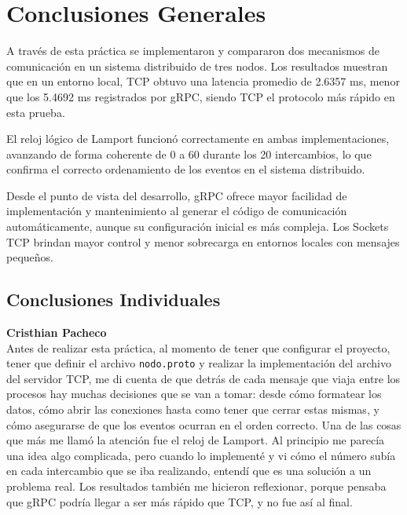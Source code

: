 \documentclass[12pt,a4paper]{article}
\begin{document}
\newpage
\section{Conclusiones Generales}

A través de esta práctica se implementaron y compararon dos mecanismos de comunicación en un sistema distribuido de tres nodos. Los resultados muestran que en un entorno local, TCP obtuvo una latencia promedio de 2.6357 ms, menor que los 5.4692 ms registrados por gRPC, siendo TCP el protocolo más rápido en esta prueba.

El reloj lógico de Lamport funcionó correctamente en ambas implementaciones, avanzando de forma coherente de 0 a 60 durante los 20 intercambios, lo que confirma el correcto ordenamiento de los eventos en el sistema distribuido.

Desde el punto de vista del desarrollo, gRPC ofrece mayor facilidad de implementación y mantenimiento al generar el código de comunicación automáticamente, aunque su configuración inicial es más compleja. Los Sockets TCP brindan mayor control y menor sobrecarga en entornos locales con mensajes pequeños.
\newpage
\vspace{0.5cm}
\subsection*{Conclusiones Individuales}

\textbf{Cristhian Pacheco} \\
Antes de realizar esta práctica, al momento de tener que configurar el proyecto, tener que definir el archivo \texttt{nodo.proto} y realizar la implementación del archivo del servidor TCP, me di cuenta de que detrás de cada mensaje que viaja entre los procesos hay muchas decisiones que se van a tomar: desde cómo formatear los datos, cómo abrir las conexiones hasta como tener que cerrar estas mismas, y cómo asegurarse de que los eventos ocurran en el orden correcto. Una de las cosas que más me llamó la atención fue el reloj de Lamport. Al principio me parecía una idea algo complicada, pero cuando lo implementé y vi cómo el número subía en cada intercambio que se iba realizando, entendí que es una solución a un problema real. Los resultados también me hicieron reflexionar, porque pensaba que gRPC podría llegar a ser más rápido que TCP, y no fue así al final.
\end{document}
